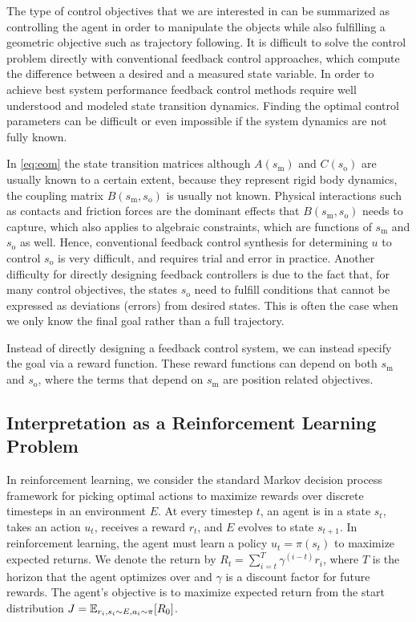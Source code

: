 The type of control objectives that we are interested in can be summarized as controlling the agent in order to manipulate the objects while also fulfilling a geometric objective such as trajectory following.
It is difficult to solve the control problem directly with conventional feedback control approaches, which compute the difference between a desired and a measured state variable.
In order to achieve best system performance feedback control methods require well understood and modeled state transition dynamics. 
Finding the optimal control parameters can be difficult or even impossible if the system dynamics are not fully known.

In \eqref{eq:eom} the state transition matrices although $A(s_\text{m})$ and $C(s_\text{o})$ are usually known to a certain extent, because they represent rigid body dynamics, the coupling matrix $B(s_\text{m}, s_\text{o})$ is usually not known. 
Physical interactions such as contacts and friction forces are the dominant effects that $B(s_\text{m}, s_\text{o})$  needs to capture, which also applies to algebraic constraints, which are functions of $s_\text{m}$ and $s_\text{o}$ as well. 
Hence, conventional feedback control synthesis for determining $u$ to control $s_\text{o}$ is very difficult, and requires trial and error in practice.
Another difficulty for directly designing feedback controllers is due to the fact that, for many control objectives, the states $s_\text{o}$ need to fulfill conditions that cannot be expressed as deviations (errors) from desired states. 
This is often the case when we only know the final goal rather than a full trajectory.

Instead of directly designing a feedback control system, we can instead specify the goal via a reward function. These reward functions can depend on both $s_\text{m}$ and $s_\text{o}$, where the terms that depend on $s_\text{m}$ are position related objectives.

\subsection{Interpretation as a Reinforcement Learning Problem}
 
In reinforcement learning, we consider the standard Markov decision process framework for picking optimal actions to maximize rewards over discrete timesteps in an environment $E$. At every timestep $t$, an agent is in a state $s_t$, takes an action $u_t$, receives a reward $r_t$, and $E$ evolves to state $s_{t+1}$. In reinforcement learning, the agent must learn a policy $u_t = \pi(s_t)$ to maximize expected returns.  We denote the return by $R_t = \sum_{i=t}^T \gamma^{(i - t)} r_i$, where $T$ is the horizon that the agent optimizes over and $\gamma$ is a discount factor for future rewards. The agent's objective is to maximize expected return from the start distribution $J = \operatorname{\mathbb{E}}_{r_i, s_i \sim E, a_i \sim \pi}[R_0]$. 


